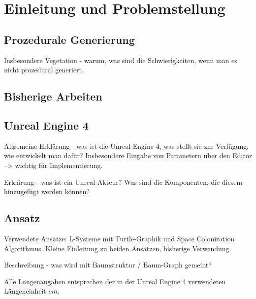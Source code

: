 \chapter{Einleitung und Problemstellung}

\section{Prozedurale Generierung}

Insbesondere Vegetation - warum, was sind die Schwierigkeiten, wenn man es nicht prozedural generiert.

\section{Bisherige Arbeiten}

\section{Unreal Engine 4}

Allgemeine Erklärung - was ist die Unreal Engine 4, was stellt sie zur Verfügung, wie entwickelt man dafür? Insbesondere Eingabe von Parametern über den Editor --> wichtig für Implementierung.

Erklärung - was ist ein Unreal-Akteur? Was sind die Komponenten, die diesem hinzugefügt werden können?

\section{Ansatz}
Verwendete Ansätze: L-Systeme mit Turtle-Graphik und Space Colonization Algorithmus. Kleine Einleitung zu beiden Ansätzen, bisherige Verwendung.

Beschreibung - was wird mit Baumstruktur / Baum-Graph gemeint?

Alle Längenangaben entsprechen der in der Unreal Engine 4 verwendeten Längeneinheit $cm$.